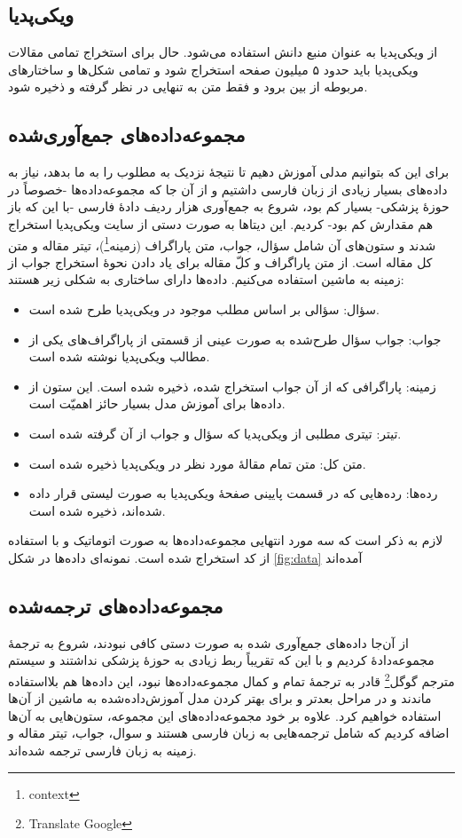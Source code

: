 \documentclass{CCI2020}
\begin{document}
\subsection{ویکی‌پدیا}
از ویکی‌پدیا به عنوان منبع دانش استفاده می‌شود. حال
برای استخراج تمامی مقالات ویکی‌پدیا باید حدود ۵ میلیون صفحه استخراج شود و تمامی شکل‌ها و ساختارهای مربوطه از بین برود و فقط متن به تنهایی در نظر گرفته و ذخیره شود.



\subsection{مجموعه‌داده‌های جمع‌آوری‌شده}
برای این که بتوانیم مدلی آموزش دهیم تا نتیجهٔ نزدیک به مطلوب را به ما بدهد، نیاز به داده‌های بسیار زیادی از زبان فارسی داشتیم و از آن جا که مجموعه‌داده‌ها -خصوصاً در حوزهٔ پزشکی- بسیار کم بود، شروع به جمع‌آوری هزار ردیف دادهٔ فارسی -با این که باز هم مقدارش کم بود- کردیم. این دیتاها به صورت دستی از سایت ویکی‌پدیا استخراج شدند و ستون‌های آن شامل سؤال، جواب، متن پاراگراف (زمینه\footnote{context})، تیتر مقاله و متن کل مقاله است. از متن پاراگراف و کلّ مقاله برای یاد دادن نحوهٔ استخراج جواب از زمینه به ماشین استفاده می‌کنیم.  داده‌ها دارای ساختاری به شکلی زیر هستند:
\begin{itemize}
    \item سؤال: سؤالی بر اساس مطلب موجود در ویکی‌پدیا طرح شده است.
    \item جواب: جواب سؤال طرح‌شده به صورت عینی از قسمتی از پاراگراف‌های یکی از مطالب ویکی‌پدیا  نوشته شده است.
    \item زمینه: پاراگرافی که از آن جواب استخراج شده، ذخیره شده است. این ستون از داده‌ها برای آموزش مدل بسیار حائز اهمیّت است.
    \item تیتر: تیتری مطلبی از ویکی‌پدیا که سؤال و جواب از آن گرفته شده است.
    \item متن کل: متن تمام مقالهٔ مورد نظر در ویکی‌پدیا ذخیره شده است.
    \item رده‌ها: رده‌هایی که در قسمت پایینی صفحهٔ ویکی‌پدیا به صورت لیستی قرار داده شده‌اند، ذخیره شده است.
\end{itemize}

لازم به ذکر است که سه مورد انتهایی مجموعه‌داده‌ها به صورت اتوماتیک و با استفاده از کد استخراج شده است. نمونه‌ای داده‌ها در شکل \ref{fig:data} آمده‌اند




\subsection{مجموعه‌داده‌های ترجمه‌شده}
از آن‌جا داده‌های جمع‌آوری شده به صورت دستی کافی نبودند، شروع به ترجمهٔ مجموعه‌دادهٔ  \cite{ref2} کردیم و با این که تقریباً ربط زیادی به حوزهٔ پزشکی نداشتند و  سیستم مترجم گوگل\footnote{Translate Google} قادر به ترجمهٔ تمام و کمال مجموعه‌داده‌ها نبود، این داده‌ها هم بلااستفاده ماندند و در مراحل بعدتر و برای بهتر کردن مدل آموزش‌داده‌شده به ماشین از آن‌ها استفاده خواهیم کرد. علاوه بر خود مجموعه‌داده‌های این مجموعه، ستون‌هایی به آن‌ها اضافه کردیم که شامل ترجمه‌هایی به زبان فارسی هستند و سوال، جواب، تیتر مقاله و زمینه به زبان فارسی ترجمه شده‌اند.
\end{document}
